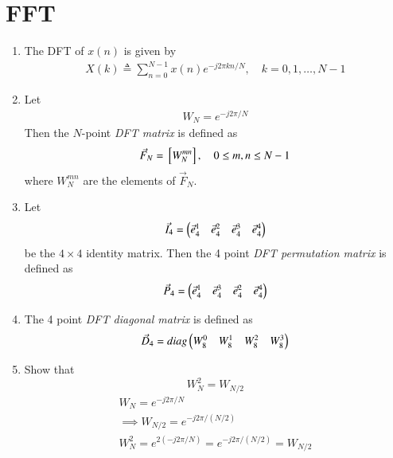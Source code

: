 \documentclass[journal,12pt,twocolumn]{IEEEtran}
\renewcommand\thesection{\arabic{section}}
\begin{document}
\section{FFT}
\begin{enumerate}[label=\arabic*.,ref=\thesection.\theenumi]
	\item The DFT of $x(n)$ is given by
	\begin{align}
		X(k) \triangleq \sum_{n=0}^{N-1} x(n) e^{-j 2 \pi k n / N}, \quad k=0,1, \ldots, N-1
	\end{align}
	\item Let 
	\begin{align}
		W_{N} = e^{-j2\pi/N} 
	\end{align}
	Then the $N$-point {\em DFT matrix} is defined as 
	\begin{align}
		\vec{F}_{N} = {}\left[W_{N}^{mn}\right], \quad 0 \le m,n \le N-1 
	\end{align}
	where $W_{N}^{mn}$ are the elements of $\vec{F}_{N}$.
	\item Let 
	\begin{align}
		\vec{I}_4 = \begin{pmatrix}\vec{e}_4^{1} &\vec{e}_4^{2} &\vec{e}_4^{3} &\vec{e}_4^{4} \end{pmatrix}
	\end{align}
	be the $4\times 4$ identity matrix.  Then the 4 point {\em DFT permutation matrix} is defined as 
	\begin{align}
		\vec{P}_4 = \begin{pmatrix}\vec{e}_4^{1} &\vec{e}_4^{3} &\vec{e}_4^{2} &\vec{e}_4^{4} \end{pmatrix}
	\end{align}
	\item The 4 point {\em DFT diagonal matrix} is defined as 
	\begin{align}
		\vec{D}_4 = diag\begin{pmatrix}W_{8}^{0} & W_{8}^{1} & W_{8}^{2} & W_{8}^{3}\end{pmatrix}
	\end{align}
	\item Show that 
	\begin{equation}
		W_{N}^{2}=W_{N/2}
	\end{equation}
	\solution
	\begin{align}
	W_{N} = e^{-j2\pi/N}\\
	\implies W_{N/2} = e^{-j2\pi/(N/2)}\\
	W_{N}^{2} = e^{2 (-j2\pi/N)} = e^{-j2\pi/(N/2)} = W_{N/2}\\
    \end{align}

\end{enumerate}
\end{document}
